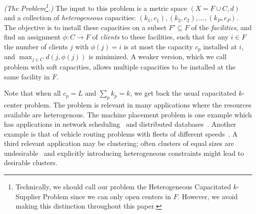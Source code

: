 \begin{definition}\emph{(The \mckc Problem\footnote{Technically, we should call our problem the Heterogeneous Capacitated $k$-Supplier Problem since we can only open centers in $F$. However, we avoid making this distinction throughout this paper.}.)}
	The input to this problem is a metric space $(X = F\cup C,d)$  %
	and  a collection of {\em heterogeneous} capacities: $(k_1,c_1), (k_2,c_2),\ldots, (k_P,c_P)$.
	The objective is to install these capacities on a subset $F'\subseteq F$ of the {\em facilities}, and find an assignment $\phi:C\to F$ of {\em clients} to these facilities,
	such that for any $i\in F$ the number of clients $j$ with $\phi(j) = i$ is at most the capacity $c_p$ installed at $i$, and $\max_{j\in C} d(j,\phi(j))$ is minimized.
	A weaker version, which we call \mckc problem with soft capacities, allows multiple capacities to be installed at the same facility in $F$.
\end{definition}
\noindent
Note that when all $c_p = L$ and $\sum_p k_p = k$, we get back the usual capacitated $k$-center problem.
The \mckc problem is relevant in many applications where the resources available are heterogenous. The machine placement problem is one example which has applications in network scheduling~\cite{QiuSZ15,ImM15a} and distributed databases~\cite{MorganL77,SKRN15}. Another example is that of  vehicle routing problems with  fleets of different speeds~\cite{GortzMN016}. A third relevant application may be clustering; often clusters of equal sizes are undesirable~\cite{GuhaRS01} and explicitly introducing heterogeneous constraints might lead to desirable clusters.

